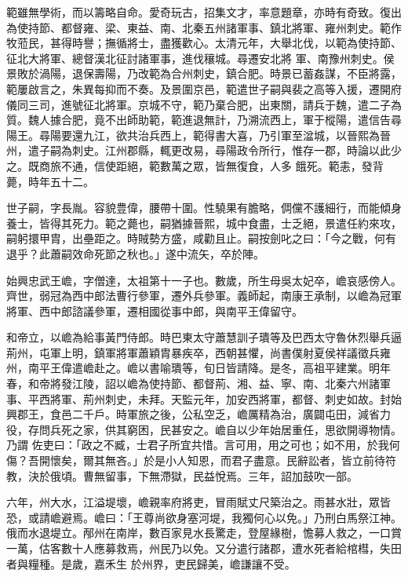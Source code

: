 \begin{pinyinscope}
 範雖無學術，而以籌略自命。愛奇玩古，招集文才，率意題章，亦時有奇致。復出為使持節、都督雍、梁、東益、南、北秦五州諸軍事、鎮北將軍、雍州刺史。範作牧蒞民，甚得時譽；撫循將士，盡獲歡心。太清元年，大舉北伐，以範為使持節、征北大將軍、總督漢北征討諸軍事，進伐穰城。尋遷安北將
 軍、南豫州刺史。侯景敗於渦陽，退保壽陽，乃改範為合州刺史，鎮合肥。時景已蓄姦謀，不臣將露，範屢啟言之，朱異每抑而不奏。及景圍京邑，範遣世子嗣與裴之高等入援，遷開府儀同三司，進號征北將軍。京城不守，範乃棄合肥，出東關，請兵于魏，遣二子為質。魏人據合肥，竟不出師助範，範進退無計，乃溯流西上，軍于樅陽，遣信告尋陽王。尋陽要還九江，欲共治兵西上，範得書大喜，乃引軍至湓城，以晉熙為晉州，遣子嗣為刺史。江州郡縣，輒更改易，尋陽政令所行，惟存一郡，時論以此少之。既商旅不通，信使距絕，範數萬之眾，皆無復食，人多
 餓死。範恚，發背薨，時年五十二。



 世子嗣，字長胤。容貌豊偉，腰帶十圍。性驍果有膽略，倜儻不護細行，而能傾身養士，皆得其死力。範之薨也，嗣猶據晉熙，城中食盡，士乏絕，景遣任約來攻，嗣躬擐甲胄，出壘距之。時賊勢方盛，咸勸且止。嗣按劍叱之曰：「今之戰，何有退乎？此蕭嗣效命死節之秋也。」遂中流矢，卒於陣。



 始興忠武王嶦，字僧達，太祖第十一子也。數歲，所生母吳太妃卒，嶦哀感傍人。齊世，弱冠為西中郎法曹行參軍，遷外兵參軍。義師起，南康王承制，以嶦為冠軍將軍、西中郎諮議參軍，遷相國從事中郎，與南平王偉留守。



 和帝立，以嶦為給事黃門侍郎。時巴東太守蕭慧訓子璝等及巴西太守魯休烈舉兵逼荊州，屯軍上明，鎮軍將軍蕭穎胄暴疾卒，西朝甚懼，尚書僕射夏侯祥議徵兵雍州，南平王偉遣嶦赴之。嶦以書喻璝等，旬日皆請降。是冬，高祖平建業。明年春，和帝將發江陵，詔以嶦為使持節、都督荊、湘、益、寧、南、北秦六州諸軍事、平西將軍、荊州刺史，未拜。天監元年，加安西將軍，都督、刺史如故。封始興郡王，食邑二千戶。時軍旅之後，公私空乏，嶦厲精為治，廣闢屯田，減省力役，存問兵死之家，供其窮困，民甚安之。嶦自以少年始居重任，思欲開導物情。乃謂
 佐吏曰：「政之不臧，士君子所宜共惜。言可用，用之可也；如不用，於我何傷？吾開懷矣，爾其無吝。」於是小人知恩，而君子盡意。民辭訟者，皆立前待符教，決於俄頃。曹無留事，下無滯獄，民益悅焉。三年，詔加鼓吹一部。



 六年，州大水，江溢堤壞，嶦親率府將吏，冒雨賦丈尺築治之。雨甚水壯，眾皆恐，或請嶦避焉。嶦曰：「王尊尚欲身塞河堤，我獨何心以免。」乃刑白馬祭江神。俄而水退堤立。邴州在南岸，數百家見水長驚走，登屋緣樹，憺募人救之，一口賞一萬，估客數十人應募救焉，州民乃以免。又分遣行諸郡，遭水死者給棺槥，失田者與糧種。是歲，嘉禾生
 於州界，吏民歸美，嶦謙讓不受。




\end{pinyinscope}
